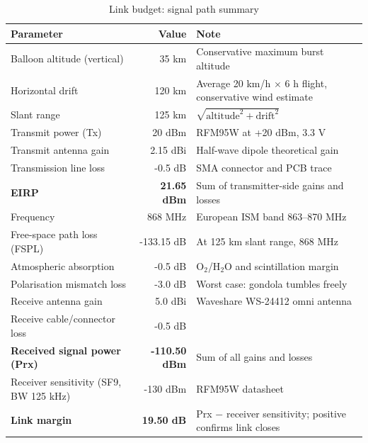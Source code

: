 \begin{table}[H]
\centering
\begin{tabular}{p{6.5cm}rp{5.5cm}}
\toprule
\textbf{Parameter} & \textbf{Value} & \textbf{Note} \\
\midrule
Balloon altitude (vertical) & 35 km & Conservative maximum burst altitude \\
Horizontal drift & 120 km & Average 20 km/h $\times$ 6 h flight, conservative wind estimate \\
Slant range & 125 km & $\sqrt{\text{altitude}^2 + \text{drift}^2}$ \\
Transmit power (Tx) & 20 dBm & RFM95W at +20 dBm, 3.3 V \\
Transmit antenna gain & 2.15 dBi & Half-wave dipole theoretical gain \\
Transmission line loss & -0.5 dB & SMA connector and PCB trace \\
\midrule
\textbf{EIRP} & \textbf{21.65 dBm} & Sum of transmitter-side gains and losses \\
\midrule
Frequency & 868 MHz & European ISM band 863--870 MHz \\
Free-space path loss (FSPL) & -133.15 dB & At 125 km slant range, 868 MHz \\
Atmospheric absorption & -0.5 dB & O$_2$/H$_2$O and scintillation margin \\
Polarisation mismatch loss & -3.0 dB & Worst case: gondola tumbles freely \\
Receive antenna gain & 5.0 dBi & Waveshare WS-24412 omni antenna \\
Receive cable/connector loss & -0.5 dB & \\
\midrule
\textbf{Received signal power (Prx)} & \textbf{-110.50 dBm} & Sum of all gains and losses \\
Receiver sensitivity (SF9, BW 125 kHz) & -130 dBm & RFM95W datasheet \\
\midrule
\textbf{Link margin} & \textbf{19.50 dB} & Prx $-$ receiver sensitivity; positive confirms link closes \\
\bottomrule
\end{tabular}
\caption{Link budget: signal path summary}
\end{table}

